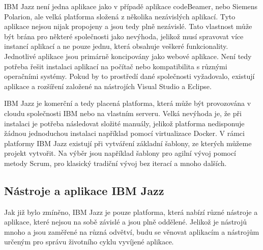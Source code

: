 \documentclass[czech,master]{diploma}
\begin{document}
IBM Jazz není jedna aplikace jako v případě aplikace codeBeamer, nebo Siemens Polarion, ale velká platforma složená z několika nezávislých aplikací. Tyto aplikace nejsou nijak propojeny a jsou tedy plně nezávislé. Tato vlastnost může být brána pro některé společnosti jako nevýhoda, jelikož musí spravovat více instancí aplikací a ne pouze jednu, která obsahuje veškeré funkcionality. Jednotlivé aplikace jsou primárně koncipovány jako webové aplikace. Není tedy potřeba řešit instalaci aplikací na počítač nebo kompatibilita s různými operačními systémy. Pokud by to prostředí dané společnosti vyžadovalo, existují aplikace a rozšíření založené na nástrojích Visual Studio a Eclipse.

IBM Jazz je komerční a tedy placená platforma, která může být provozována v cloudu společnosti IBM nebo na vlastním serveru. Velká nevýhoda je, že při instalaci je potřeba následovat složité manuály, jelikož platforma nedisponuje žádnou jednoduchou instalaci například pomocí virtualizace Docker. V rámci platformy IBM Jazz existují při vytváření základní šablony, ze kterých můžeme projekt vytvořit.  Na výběr jsou například šablony pro agilní vývoj pomocí metody Scrum, pro klasický tradiční vývoj bez iterací a mnoho dalších.


\subsection{Nástroje a aplikace IBM Jazz}
Jak již bylo zmíněno, IBM Jazz je pouze platforma, která nabízí různé nástroje a aplikace, které nejsou na sobě závislé a jsou plně oddělené. Jelikož je nástrojů mnoho a jsou zaměřené na různá odvětví, budu se věnovat aplikacím a nástrojům určeným pro správu životního cyklu vyvíjené aplikace. \cite{ref:jazz_products}
\end{document}
